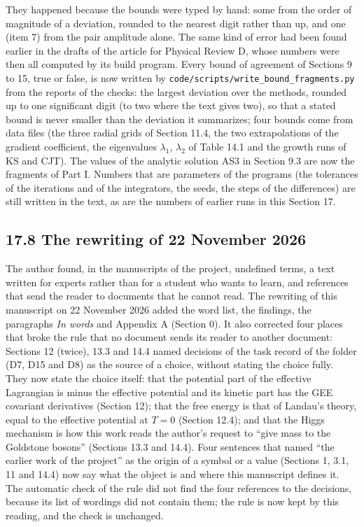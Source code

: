 \documentclass[
  10pt,
]{article}
\begin{document}
They happened because the bounds were typed by hand: some from the order
of magnitude of a deviation, rounded to the nearest digit rather than
up, and one (item 7) from the pair amplitude alone. The same kind of
error had been found earlier in the drafts of the article for Physical
Review D, whose numbers were then all computed by its build program.
Every bound of agreement of Sections 9 to 15, true or false, is now
written by \texttt{code/scripts/write\_bound\_fragments.py} from the
reports of the checks: the largest deviation over the methods, rounded
up to one significant digit (to two where the text gives two), so that a
stated bound is never smaller than the deviation it summarizes; four
bounds come from data files (the three radial grids of Section 11.4, the
two extrapolations of the gradient coefficient, the eigenvalues
\(\lambda_1\), \(\lambda_2\) of Table 14.1 and the growth runs of KS and
CJT). The values of the analytic solution AS3 in Section 9.3 are now the
fragments of Part I. Numbers that are parameters of the programs (the
tolerances of the iterations and of the integrators, the seeds, the
steps of the differences) are still written in the text, as are the
numbers of earlier runs in this Section 17.

\hypertarget{the-rewriting-of-22-november-2026}{%
\subsection{17.8 The rewriting of 22 November
2026}\label{the-rewriting-of-22-november-2026}}

The author found, in the manuscripts of the project, undefined terms, a
text written for experts rather than for a student who wants to learn,
and references that send the reader to documents that he cannot read.
The rewriting of this manuscript on 22 November 2026 added the word
list, the findings, the paragraphs \emph{In words} and Appendix A
(Section 0). It also corrected four places that broke the rule that no
document sends its reader to another document: Sections 12 (twice), 13.3
and 14.4 named decisions of the task record of the folder (D7, D15 and
D8) as the source of a choice, without stating the choice fully. They
now state the choice itself: that the potential part of the effective
Lagrangian is minus the effective potential and its kinetic part has the
GEE covariant derivatives (Section 12); that the free energy is that of
Landau's theory, equal to the effective potential at \(T=0\) (Section
12.4); and that the Higgs mechanism is how this work reads the author's
request to ``give mass to the Goldstone bosons'' (Sections 13.3 and
14.4). Four sentences that named ``the earlier work of the project'' as
the origin of a symbol or a value (Sections 1, 3.1, 11 and 14.4) now say
what the object is and where this manuscript defines it. The automatic
check of the rule did not find the four references to the decisions,
because its list of wordings did not contain them; the rule is now kept
by this reading, and the check is unchanged.
\end{document}
